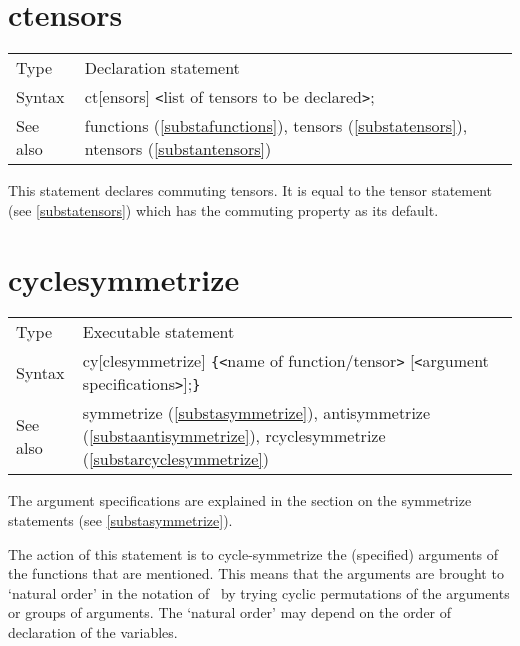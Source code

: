  
\section{ctensors}
\label{substactensors}

\noindent \begin{tabular}{ll}
Type & Declaration statement\\
Syntax & ct[ensors] {\tt<}list of tensors to be declared{\tt>}; \\
See also & functions (\ref{substafunctions}), tensors 
        (\ref{substatensors}), ntensors (\ref{substantensors})
\end{tabular} \vspace{4mm}

\noindent This statement declares commuting 
tensors. It is equal to the tensor statement (see 
\ref{substatensors}) which has the commuting property as its default. 
\vspace{10mm}


\section{cyclesymmetrize}
\label{substacyclesymmetrize}

\noindent \begin{tabular}{ll}
Type & Executable statement\\
Syntax & cy[clesymmetrize] \verb:{:{\tt<}name of function/tensor{\tt>}
         [{\tt<}argument specifications{\tt>}];\verb:}: \\
See also & symmetrize (\ref{substasymmetrize}), antisymmetrize 
(\ref{substaantisymmetrize}), rcyclesymmetrize (\ref{substarcyclesymmetrize})
\end{tabular} \vspace{4mm}

\noindent The argument specifications are explained 
in the section on the symmetrize statements (see \ref{substasymmetrize}). 
\medskip

\noindent The action of this statement is to cycle-symmetrize the (specified) 
arguments of the functions that are mentioned. This means that the 
arguments are brought to `natural order' in the notation of \FORM\ by trying 
cyclic permutations of the arguments or groups of arguments. The `natural 
order' may depend on the order of declaration of the variables. 
\vspace{10mm}

